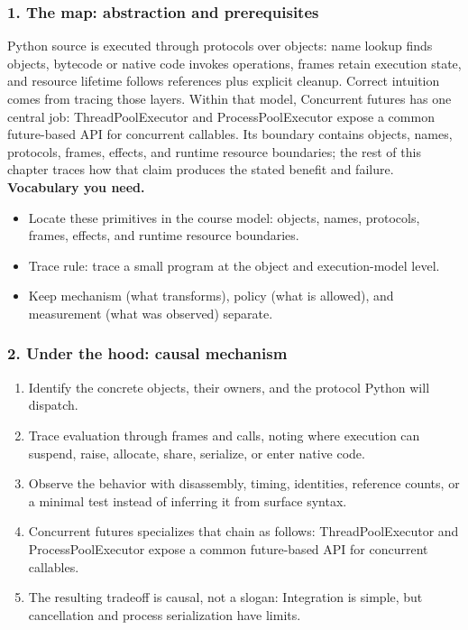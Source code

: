 \subsubsection*{1. The map: abstraction and prerequisites}
Python source is executed through protocols over objects: name lookup finds objects, bytecode or native code invokes operations, frames retain execution state, and resource lifetime follows references plus explicit cleanup. Correct intuition comes from tracing those layers.
Within that model, Concurrent futures has one central job: ThreadPoolExecutor and ProcessPoolExecutor expose a common future-based API for concurrent callables. Its boundary contains objects, names, protocols, frames, effects, and runtime resource boundaries; the rest of this chapter traces how that claim produces the stated benefit and failure.
\textbf{Vocabulary you need.}\begin{itemize}
\item Locate these primitives in the course model: objects, names, protocols, frames, effects, and runtime resource boundaries.
\item Trace rule: trace a small program at the object and execution-model level.
\item Keep mechanism (what transforms), policy (what is allowed), and measurement (what was observed) separate.
\end{itemize}
\subsubsection*{2. Under the hood: causal mechanism}\begin{enumerate}
\item Identify the concrete objects, their owners, and the protocol Python will dispatch.
\item Trace evaluation through frames and calls, noting where execution can suspend, raise, allocate, share, serialize, or enter native code.
\item Observe the behavior with disassembly, timing, identities, reference counts, or a minimal test instead of inferring it from surface syntax.
\item Concurrent futures specializes that chain as follows: ThreadPoolExecutor and ProcessPoolExecutor expose a common future-based API for concurrent callables.
\item The resulting tradeoff is causal, not a slogan: Integration is simple, but cancellation and process serialization have limits.
\end{enumerate}
